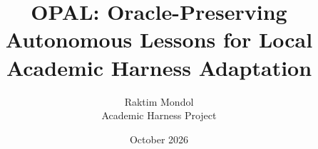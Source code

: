 \documentclass[11pt]{article}
\title{OPAL: Oracle-Preserving Autonomous Lessons for Local Academic Harness Adaptation}
\author{Raktim Mondol\\Academic Harness Project}
\date{October 2026}
\begin{document}
\maketitle

\begin{abstract}

\end{abstract}











\appendix






\end{document}
